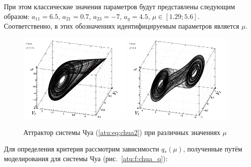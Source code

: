 При этом классические значения параметров будут представлены следующим образом:
$ a_{11} = 6.5 $, $a_{21} = 0.7$, $ a_{23} = -7 $, $ a_g = 4.5 $,
$ \mu \in [ 1.29 ; 5.6 ] $.
Соответственно, в этих обозначениях
идентифицируемым параметров является $\mu$.



\begin{figure}[htb!]
\centerline{
  \includegraphics[width=0.49\textwidth]{p/cha/chua/chua_1-p_xyz_mu=2x74.png}
  \includegraphics[width=0.49\textwidth]{p/cha/chua/chua_1-p_xyz_mu=4x50.png}
}
\caption{Аттрактор системы Чуа (\ref{atu:eq:chua2}) при различных значениях $\mu$}
\label{atu:f:chua_phase}
\end{figure}


Для определения критерия рассмотрим зависимости
$q_{*}(\mu) $, полученные путём моделирования
для системы Чуа (рис.~\ref{atu:f:chua_q}):

